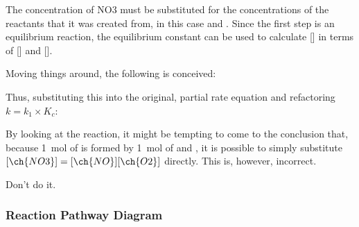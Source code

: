 				\eqndiagram{
					\[ R = k\sbs{1}[\ch{NO3}][\ch{NO}] \]
				}

				The concentration of NO3 must be substituted for the concentrations of the reactants that it was created from, in this case
				 and . Since the first step is an equilibrium reaction, the equilibrium constant \Kc can be used to calculate
				[] in terms of [] and [].

				\eqndiagram{
					\[ K_{c} = \frac{[\ch{NO3}]}{[\ch{NO}][\ch{O2}]} \]
				}

				\pagebreak
				Moving things around, the following is conceived:

				\eqndiagram{
					\[ [\ch{NO3}] = K_{c}[\ch{NO}][\ch{O2}] \]
				}

				Thus, substituting this into the original, partial rate equation and refactoring $k = k_{1} \times K_{c}$:

				\eqndiagram{
					\[ R = k_{1}K_{c}[\ch{NO}][\ch{O2}][\ch{NO}] = k[\ch{NO}]^{2}[\ch{O2}]\]
				}


				By looking at the reaction, it might be tempting to come to the conclusion that, because \SI{1}{\mole} of  is formed by
				\SI{1}{\mole} of  and , it is possible to simply substitute $[\ch{NO3}] = [\ch{NO}][\ch{O2}]$ directly.
				This is, however, incorrect.

				Don't do it.



			\subsubsection{Reaction Pathway Diagram}


